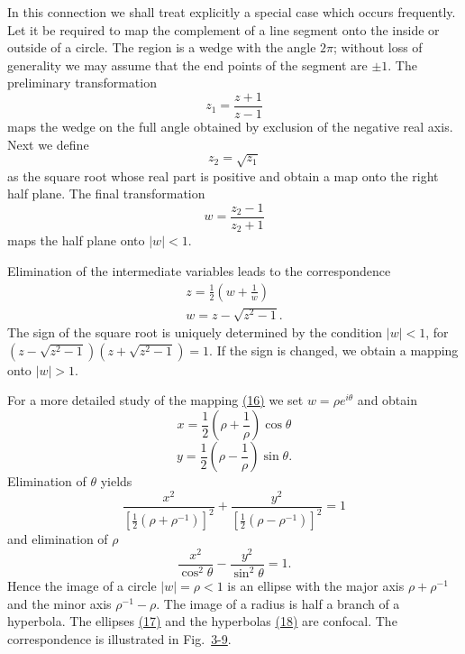 In this connection we shall treat explicitly a special case which occurs frequently. Let it be required to map the complement of a line segment onto the inside or outside of a circle. The region is a wedge with the angle $2\pi$; without loss of generality we may assume that the end points of the segment are $\pm1$. The preliminary transformation
\begin{equation*}
z _ {1} = \frac {z + 1}{z - 1}
\end{equation*}
maps the wedge on the full angle obtained by exclusion of the negative real axis. Next we define
\begin{equation*}
z _ {2} = \sqrt {z _ {1}}
\end{equation*}
as the square root whose real part is positive and obtain a map onto the right half plane. The final transformation
\begin{equation*}
w = \frac {z _ {2} - 1}{z _ {2} + 1}
\end{equation*}
maps the half plane onto $|w| < 1$.

Elimination of the intermediate variables leads to the correspondence
\begin{equation*}
\begin{array}{c} z = \frac {1}{2} \left(w + \frac {1}{w}\right) \\ w = z - \sqrt {z ^ {2} - 1}. \end{array}\tag{16}\label{eq:3.16}
\end{equation*}
The sign of the square root is uniquely determined by the condition $|w| < 1$, for $(z - \sqrt{z^{2} - 1})(z + \sqrt{z^{2} - 1}) = 1$. If the sign is changed, we obtain a mapping onto $|w| > 1$.


For a more detailed study of the mapping \hyperref[eq:3.16]{(16)} we set $w = \rho e^{i\theta}$ and obtain
\begin{equation*}
x = \frac {1}{2} \left(\rho + \frac {1}{\rho}\right) \cos \theta
\end{equation*}
\begin{equation*}
y = \frac {1}{2} \left(\rho - \frac {1}{\rho}\right) \sin \theta .
\end{equation*}
Elimination of $\theta$ yields
\begin{equation*}
\frac {x ^ {2}}{[ \frac {1}{2} (\rho + \rho^ {- 1}) ] ^ {2}} + \frac {y ^ {2}}{[ \frac {1}{2} (\rho - \rho^ {- 1}) ] ^ {2}} = 1\tag{17}\label{eq:3.17}
\end{equation*}
and elimination of $\rho$
\begin{equation*}
\frac {x ^ {2}}{\cos^ {2} \theta} - \frac {y ^ {2}}{\sin^ {2} \theta} = 1.\tag{18}\label{eq:3.18}
\end{equation*}
Hence the image of a circle $|w| = \rho < 1$ is an ellipse with the major axis $\rho + \rho^{-1}$ and the minor axis $\rho^{-1} - \rho$. The image of a radius is half a branch of a hyperbola. The ellipses \hyperref[eq:3.17]{(17)} and the hyperbolas \hyperref[eq:3.18]{(18)} are confocal. The correspondence is illustrated in Fig.~\hyperref[fig:3-9]{3-9}.

